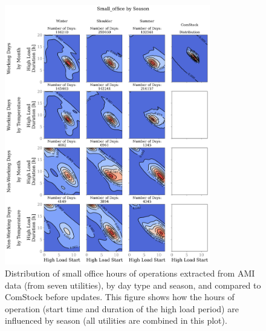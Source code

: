 \begin{figure}
    \centering \includegraphics[width=0.8\textwidth]{figures/small_office_season.png}
    \caption[Distribution of small office hours of operations, by day type and season]{Distribution of small office hours of operations extracted from AMI data (from seven utilities), by day type and season, and compared to ComStock before updates. This figure shows how the hours of operation (start time and duration of the high load period) are influenced by season (all utilities are combined in this plot).}
    \label{fig:small_office_season}
\end{figure}

